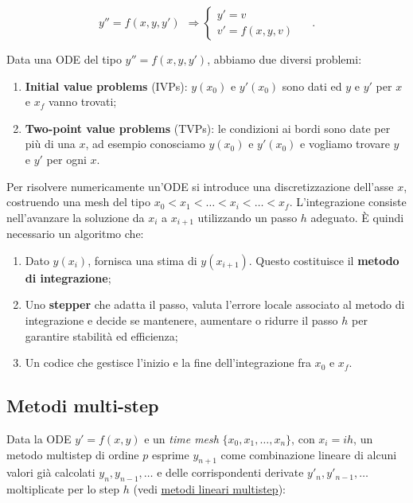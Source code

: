 \documentclass{article}
\begin{document}
	\[ y''=f(x, y, y')\ \ \Rightarrow \begin{cases} y' = v \\ v' = f(x, y, v) \end{cases} \ \ \ \ \ \ .\]
	
	Data una ODE del tipo $y''=f(x, y, y')$, abbiamo due diversi problemi:
	\begin{enumerate}
		\item \textbf{Initial value problems} (IVPs): $y(x_0)$ e $y'(x_0)$ sono dati ed $y$ e $y'$ per $x$ e $x_f$ vanno trovati;
		\item \textbf{Two-point value problems} (TVPs): le condizioni ai bordi sono date per più di una $x$, ad esempio conosciamo $y(x_0)$ e $y'(x_0)$ e vogliamo trovare $y$ e $y'$ per ogni $x$.
	\end{enumerate}
	Per risolvere numericamente un'ODE si introduce una discretizzazione dell'asse $x$,
	costruendo una mesh del tipo $x_0 < x_1 < \dots <x_i<\dots< x_f$. L'integrazione consiste
	nell'avanzare la soluzione da $x_i$ a $x_{i+1}$ utilizzando un passo $h$ adeguato.
	È quindi necessario un algoritmo che:
	
	\begin{enumerate}
		\item Dato $y(x_i)$, fornisca una stima di $y(x_{i+1})$. Questo costituisce il \textbf{metodo di integrazione}; 
		\item Uno \textbf{stepper} che adatta il passo, valuta l'errore locale associato al metodo di integrazione e decide se mantenere, aumentare o ridurre il passo $h$ per garantire stabilità ed efficienza;
		\item Un codice che gestisce l'inizio e la fine dell'integrazione fra $x_0$ e $x_f$.
	\end{enumerate}
	
	
	\vspace{1cm}
	\subsection{Metodi multi-step}
	
	Data la ODE $y' = f(x,y)$ e un \emph{time mesh} $\{ x_0, x_1, \dots, x_n \}$, con $x_i=ih$, un metodo multistep di ordine $p$ esprime $y_{n+1}$ come combinazione lineare di alcuni valori già calcolati $y_n, y_{n-1}, \dots$ e delle corrispondenti derivate $y'_n, y'_{n-1}, \dots$ moltiplicate per lo step $h$ (vedi \href{https://en.wikipedia.org/wiki/Linear_multistep_method}{metodi lineari multistep}): 
	
\end{document}
